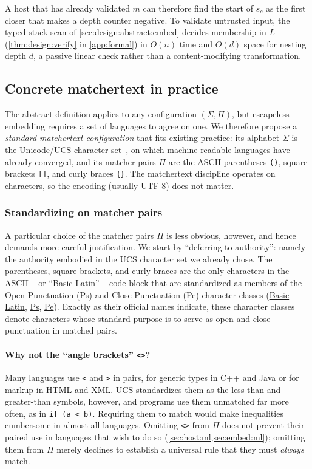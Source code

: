 A host that has already validated $m$
can therefore find the start of $s_c$
as the first closer that makes a depth counter negative.
To validate untrusted input,
the typed stack scan of \cref{sec:design:abstract:embed}
decides membership in $L$
(\cref{thm:design:verify} in \cref{app:formal})
in $O(n)$ time and $O(d)$ space for nesting depth $d$,
a passive linear check rather than a content-modifying transformation.


\subsection{Concrete matchertext in practice}
\label{sec:design:concrete}

The abstract definition applies to any configuration $(\Sigma,\Pi)$,
but escapeless embedding requires a set of languages to agree on one.
We therefore propose a \emph{standard matchertext configuration}
that fits existing practice:
its alphabet $\Sigma$ is the Unicode/UCS character set~\cite{iso10646ucs},
on which machine-readable languages have already converged,
and its matcher pairs $\Pi$ are
the ASCII parentheses \verb|()|,
square brackets \verb|[]|,
and curly braces \verb|{}|.
The matchertext discipline operates on characters,
so the encoding (usually UTF-8) does not matter.

\subsubsection{Standardizing on matcher pairs}
\label{sec:design:concrete:standard}

A particular choice of the matcher pairs $\Pi$ is less obvious, however,
and hence demands more careful justification.
We start by ``deferring to authority'':
namely the authority embodied in
the UCS character set we already chose.
The parentheses, square brackets, and curly braces
are the only characters in the ASCII --
or ``Basic Latin'' --
code block that are standardized as members of the
Open Punctuation (Ps) and Close Punctuation (Pe)
character classes
(\href{https://www.compart.com/en/unicode/block/U+0000}{Basic Latin},
\href{https://www.compart.com/en/unicode/category/Ps}{Ps},
\href{https://www.compart.com/en/unicode/category/Pe}{Pe}).
Exactly as their official names indicate,
these character classes denote characters whose standard purpose
is to serve as open and close punctuation in matched pairs.

\paragraph{Why not the ``angle brackets'' \texttt{<>}?}
Many languages use \verb|<| and \verb|>| in pairs,
for generic types in C++ and Java or for markup in HTML and XML.
UCS standardizes them
as the less-than and greater-than symbols, however,
and programs use them unmatched far more often,
as in \verb|if (a < b)|.
Requiring them to match would make inequalities cumbersome
in almost all languages.
Omitting \verb|<>| from $\Pi$ does not prevent their paired use
in languages that wish to do so (\cref{sec:host:ml,sec:embed:ml});
omitting them from $\Pi$ merely declines to establish a universal rule
that they must \emph{always} match.

